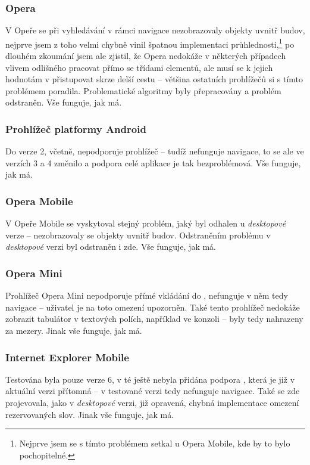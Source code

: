 \subsubsection{Opera}
V Opeře se při vyhledávání v rámci navigace nezobrazovaly objekty uvnitř budov, nejprve jsem z toho velmi chybně vinil špatnou implementaci průhlednosti,\footnote{Nejprve jsem se s tímto problémem setkal u Opera Mobile, kde by to bylo pochopitelné.} po dlouhém zkoumání jsem ale zjistil, že Opera nedokáže v některých případech vlivem odlišného   pracovat přímo se třídami  elementů, ale musí se k jejich hodnotám v  přistupovat skrze delší cestu -- většina ostatních prohlížečů si s tímto problémem poradila. Problematické algoritmy byly přepracovány a problém odstraněn. Vše funguje, jak má.

\subsubsection{Prohlížeč platformy Android}
Do verze 2, včetně, nepodporuje prohlížeč  -- tudíž nefunguje navigace, to se ale ve verzích 3 a 4 změnilo a podpora celé aplikace je tak bezproblémová. Vše funguje, jak má.

\subsubsection{Opera Mobile}
V Opeře Mobile se vyskytoval stejný problém, jaký byl odhalen u \textit{desktopové} verze -- nezobrazovaly se objekty uvnitř budov. Odstraněním problému v \textit{desktopové} verzi byl odstraněn i zde. Vše funguje, jak má.

\subsubsection{Opera Mini}
Prohlížeč Opera Mini nepodporuje přímé vkládání  do , nefunguje v něm tedy navigace -- uživatel je na toto omezení upozorněn. Také tento prohlížeč nedokáže zobrazit tabulátor v textových polích, například ve  konzoli -- byly tedy nahrazeny za mezery. Jinak vše funguje, jak má.

\subsubsection{Internet Explorer Mobile}
Testována byla pouze verze 6, v té ještě nebyla přidána podpora , která je již v aktuální verzi přítomná -- v testované verzi tedy nefunguje navigace. Také se zde projevovala, jako v \textit{desktopové} verzi, již opravená, chybná implementace omezení rezervovaných slov. Jinak vše funguje, jak má.

